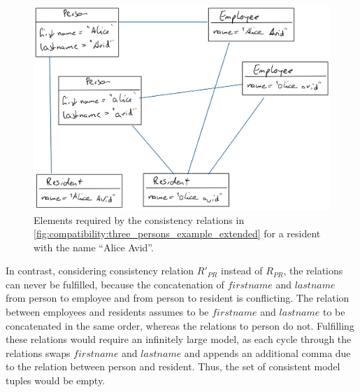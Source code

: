 \begin{figure}
    \centering
    \includegraphics[width=\textwidth]{figures/correctness/compatibility/intuitive_incompatibility.png}
    \caption[Example for an intuitive notion of incompatibility]{Elements required by the consistency relations in \autoref{fig:compatibility:three_persons_example_extended} for a resident with the name \enquote{Alice Avid}.}
    \label{fig:compatibility:intuitive_incompatibility}
\end{figure}

In contrast, considering consistency relation $R'_{PR}$ instead of $R_{PR}$, the relations can never be fulfilled, because the concatenation of $firstname$ and $lastname$ from person to employee and from person to resident is conflicting.
The relation between employees and residents assumes to be $firstname$ and $lastname$ to be concatenated in the same order, whereas the relations to person do not.
Fulfilling these relations would require an infinitely large model, as each cycle through the relations swaps $firstname$ and $lastname$ and appends an additional comma due to the relation between person and resident.
Thus, the set of consistent model tuples would be empty.

